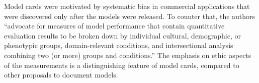 \documentclass{article}
\begin{document}
Model cards were motivated by systematic bias in commercial applications that were discovered only after the models were released. To counter that, the authors ``advocate for measures of model performance that contain quantitative evaluation results to be broken down by individual cultural, demographic, or phenotypic groups, domain-relevant conditions, and intersectional analysis combining two (or more) groups and conditions.'' The emphasis on ethic aspects of the measurements is a distinguishing feature of model cards, compared to other proposals to document models.




\end{document}

